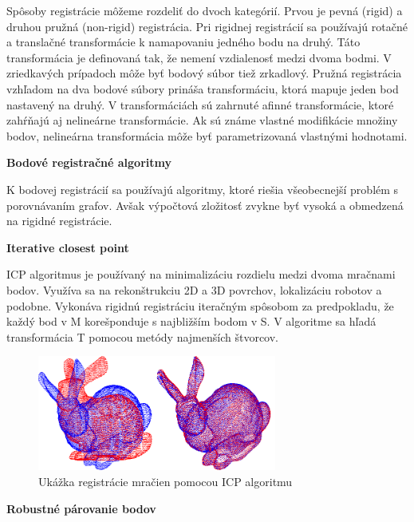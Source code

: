 Spôsoby registrácie môžeme rozdeliť do dvoch kategórií. Prvou je pevná (rigid) a druhou pružná (non-rigid) registrácia. Pri rigidnej registrácií sa používajú rotačné a translačné transformácie k namapovaniu jedného bodu na druhý. Táto transformácia je definovaná tak, že nemení vzdialenosť medzi dvoma bodmi. V zriedkavých prípadoch môže byť bodový súbor tiež zrkadlový. Pružná registrácia vzhľadom na dva bodové súbory prináša transformáciu, ktorá mapuje jeden bod nastavený na druhý. V transformáciách sú zahrnuté afinné transformácie, ktoré zahŕňajú aj nelineárne transformácie. Ak sú známe vlastné modifikácie množiny bodov, nelineárna transformácia môže byť parametrizovaná vlastnými hodnotami.\newline

\textbf{Bodové registračné algoritmy}

K bodovej registrácií sa používajú algoritmy, ktoré riešia všeobecnejší problém s porovnávaním grafov. Avšak výpočtová zložitosť zvykne byť vysoká a obmedzená na rigidné registrácie.\newline


\textbf{Iterative closest point}

ICP algoritmus je používaný na minimalizáciu rozdielu medzi dvoma mračnami bodov. Využíva sa na rekonštrukciu 2D a 3D povrchov, lokalizáciu robotov a podobne. Vykonáva rigidnú registráciu iteračným spôsobom za predpokladu, že každý bod v M korešponduje s najbližším bodom v S. V algoritme sa hľadá transformácia T pomocou metódy najmenších štvorcov.

\begin{figure}[h]

	\centering

	\includegraphics[width=0.7\textwidth]{figures/icp_principle.png} 

	\caption{Ukážka registrácie mračien pomocou ICP algoritmu}
	\label{fig:icp_principle}

\end{figure}
\newpage
\textbf{Robustné párovanie bodov}

